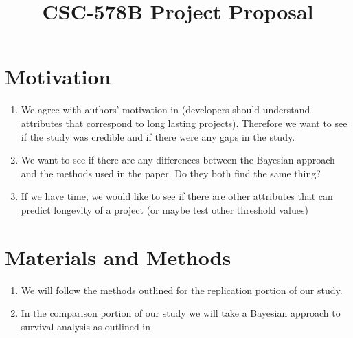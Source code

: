 \documentclass[conference]{IEEEtran}
\begin{document}


\title{CSC-578B Project Proposal}

\author{
}

\maketitle

\section{Motivation}

\begin{enumerate}
    \item We agree with authors' motivation in \cite{ali2020cheating} (developers should understand attributes that correspond to long lasting projects). Therefore we want to see if the study was credible and if there were any gaps in the study.
    \item We want to see if there are any differences between the Bayesian approach and the methods used in the paper. Do they both find the same thing?
    \item If we have time, we would like to see if there are other attributes that can predict longevity of a project (or maybe test other threshold values)
\end{enumerate}

\section{Materials and Methods} %

\begin{enumerate}
    \item We will follow the methods outlined \cite{ali2020cheating} for the replication portion of our study.
    \item In the comparison portion of our study we will take a Bayesian approach to survival analysis as outlined in \cite{kelter2020bayesian}
\end{enumerate}
\end{document}
